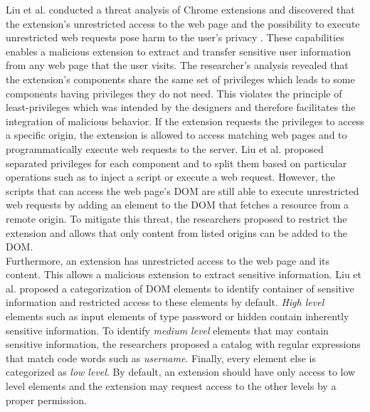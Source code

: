 	Liu et al. conducted a threat analysis of Chrome extensions and discovered that the extension's unrestricted access to the web page and the possibility to execute unrestricted web requests pose harm to the user's privacy \cite{Liu12chromeextensions:}. These capabilities enables a malicious extension to extract and transfer sensitive user information from any web page that the user visits. The researcher's analysis revealed that the extension's components share the same set of privileges which leads to some components having privileges they do not need. This violates the principle of least-privileges which was intended by the designers and therefore facilitates the integration of malicious behavior. 
	If the extension requests the privileges to access a specific origin, the extension is allowed to access matching web pages and to programmatically execute web requests to the server. Liu et al. proposed separated privileges for each component and to split them based on particular operations such as to inject a script or execute a web request. However, the scripts that can access the web page's DOM are still able to execute unrestricted web requests by adding an element to the DOM that fetches a resource from a remote origin. To mitigate this threat, the researchers proposed to restrict the extension and allows that only content from listed origins can be added to the DOM. \\
	Furthermore, an extension has unrestricted access to the web page and its content. This allows a malicious extension to extract sensitive information. Liu et al. proposed a categorization of DOM elements to identify container of sensitive information and restricted access to these elements by default. \textit{High level} elements such as input elements of type password or hidden contain inherently sensitive information. To identify \textit{medium level} elements that may contain sensitive information, the researchers proposed a catalog with regular expressions that match code words such as \textit{username}. Finally, every element else is categorized as \textit{low level}. By default, an extension should have only access to low level elements and the extension may request access to the other levels by a proper permission. \\
 	
